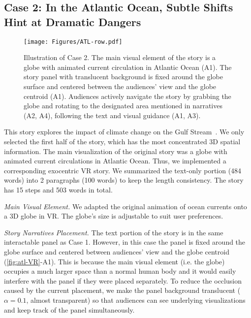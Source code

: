 \subsection{Case 2: In the Atlantic Ocean, Subtle Shifts Hint at Dramatic Dangers}
\label{subsec:case2}
\begin{figure*}[t]
\centering
  \texttt{[image: Figures/ATL-row.pdf]}
  \caption{Illustration of Case 2. The main visual element of the story is a globe with animated current circulation in Atlantic Ocean (A1). The story panel with translucent background is fixed around the globe surface and centered between the audiences' view and the globe centroid (A1). Audiences actively navigate the story by grabbing the globe and rotating to the designated area mentioned in narratives (A2, A4), following the text and visual guidance (A1, A3).}
  \label{fig:atl-VR}
\end{figure*}
This story explores the impact of climate change on the Gulf Stream~\cite{atlantic}. We only selected the first half of the story, which has the most concentrated 3D spatial information. The main visualization of the original story was a globe with animated current circulations in Atlantic Ocean. Thus, we implemented a corresponding exocentric VR story. We summarized the text-only portion (484 words) into 2 paragraphs (100 words) to keep the length consistency. {The story has 15 steps and 503 words in total.}

\textit{Main Visual Element.} We adapted the original animation of ocean currents onto a 3D globe in VR. The globe’s size is adjustable to suit user preferences.

\textit{Story Narratives Placement.} The text portion of the story is in the same interactable panel as Case 1. However, in this case the panel is fixed around the globe surface and centered between audiences' view and the globe centroid (\autoref{fig:atl-VR}-A1). This is because the main visual element (i.e. the globe) occupies a much larger space than a normal human body and it would easily interfere with the panel if they were placed separately. To reduce the occlusion caused by the current placement, we make the panel background translucent ($\alpha = 0.1$, almost transparent) so that audiences can see underlying visualizations and keep track of the panel simultaneously.

